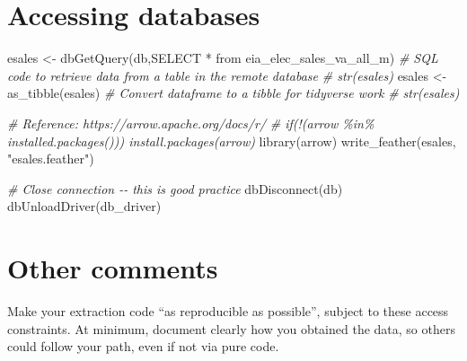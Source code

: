 \documentclass[
]{book}
\newenvironment{Shaded}{\begin{snugshade}}{\end{snugshade}}
\newcommand{\CommentTok}[1]{\textcolor[rgb]{0.56,0.35,0.01}{\textit{#1}}}
\newcommand{\FunctionTok}[1]{\textcolor[rgb]{0.00,0.00,0.00}{#1}}
\newcommand{\NormalTok}[1]{#1}
\newcommand{\OtherTok}[1]{\textcolor[rgb]{0.56,0.35,0.01}{#1}}
\newcommand{\StringTok}[1]{\textcolor[rgb]{0.31,0.60,0.02}{#1}}
\begin{document}
\hypertarget{accessing-databases}{%
\section{Accessing databases}\label{accessing-databases}}

\begin{Shaded}
\begin{Highlighting}[]
\NormalTok{esales }\OtherTok{\textless{}{-}} \FunctionTok{dbGetQuery}\NormalTok{(db,}\StringTok{\textquotesingle{}SELECT * from eia\_elec\_sales\_va\_all\_m\textquotesingle{}}\NormalTok{) }\CommentTok{\# SQL code to retrieve data from a table in the remote database}
\CommentTok{\# str(esales)}
\NormalTok{esales }\OtherTok{\textless{}{-}} \FunctionTok{as\_tibble}\NormalTok{(esales) }\CommentTok{\# Convert dataframe to a \textquotesingle{}tibble\textquotesingle{} for tidyverse work}
\CommentTok{\# str(esales)}
\end{Highlighting}
\end{Shaded}

\begin{Shaded}
\begin{Highlighting}[]
\CommentTok{\# Reference: https://arrow.apache.org/docs/r/}
\CommentTok{\# if(!(\textquotesingle{}arrow\textquotesingle{} \%in\% installed.packages())) install.packages(\textquotesingle{}arrow\textquotesingle{})}
\FunctionTok{library}\NormalTok{(arrow)}
\FunctionTok{write\_feather}\NormalTok{(esales, }\StringTok{"esales.feather"}\NormalTok{)}
\end{Highlighting}
\end{Shaded}

\begin{Shaded}
\begin{Highlighting}[]
\CommentTok{\# Close connection {-}{-} this is good practice}
\FunctionTok{dbDisconnect}\NormalTok{(db)}
\FunctionTok{dbUnloadDriver}\NormalTok{(db\_driver)}
\end{Highlighting}
\end{Shaded}

\hypertarget{other-comments}{%
\section{Other comments}\label{other-comments}}

Make your extraction code ``as reproducible as possible'', subject to these access constraints. At minimum, document clearly how you obtained the data, so others could follow your path, even if not via pure code.
\end{document}
